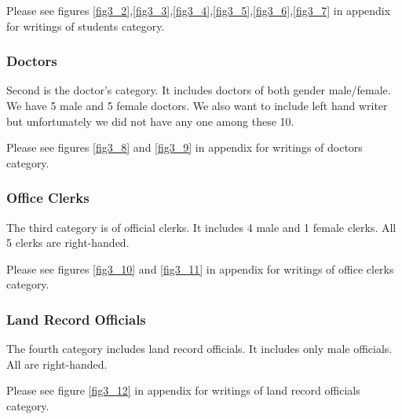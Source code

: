 \documentclass[a4paper,conference]{IEEEtran}
\begin{document}


Please see figures \ref{fig3_2},\ref{fig3_3},\ref{fig3_4},\ref{fig3_5},\ref{fig3_6},\ref{fig3_7} in appendix for writings of students category. 

\subsubsection{Doctors}
Second is the doctor’s category. It includes doctors of both gender male/female. We have 5 male and 5 female doctors. We also want to include left hand writer but unfortunately we did not have any one among these 10.


Please see figures \ref{fig3_8} and \ref{fig3_9} in appendix for writings of doctors category. 
\subsubsection{Office Clerks}
The third category is of official clerks. It includes 4 male and 1 female clerks. All 5 clerks are right-handed.




Please see figures \ref{fig3_10} and \ref{fig3_11} in appendix for writings of office clerks category. 
\subsubsection{Land Record Officials}

The fourth category includes land record officials. It includes only male officials. All are right-handed.

Please see figure \ref{fig3_12} in appendix for writings of land record officials category.
\end{document}
